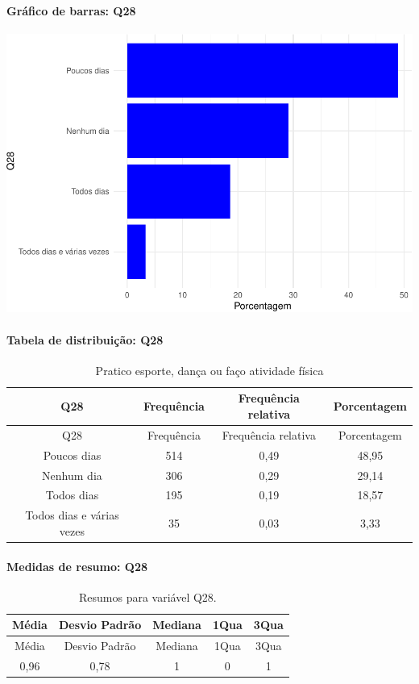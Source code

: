 \documentclass[]{article}
\let\oldparagraph\paragraph
\renewcommand{\paragraph}[1]{\oldparagraph{#1}\mbox{}}
\begin{document}
\hypertarget{gruxe1fico-de-barras-q28}{%
\paragraph{Gráfico de barras: Q28}\label{gruxe1fico-de-barras-q28}}

\begin{center}\includegraphics[width=0.75\linewidth]{relatorio_covid19_files/figure-latex/unnamed-chunk-835-1} \end{center}

\hypertarget{tabela-de-distribuiuxe7uxe3o-q28}{%
\paragraph{Tabela de distribuição: Q28}\label{tabela-de-distribuiuxe7uxe3o-q28}}

\begin{longtable}[]{@{}cccc@{}}
\caption{\label{tab:unnamed-chunk-836}Pratico esporte, dança ou faço atividade física}\tabularnewline
\toprule
Q28 & Frequência & Frequência relativa & Porcentagem\tabularnewline
\midrule
\endfirsthead
\toprule
Q28 & Frequência & Frequência relativa & Porcentagem\tabularnewline
\midrule
\endhead
Poucos dias & 514 & 0,49 & 48,95\tabularnewline
Nenhum dia & 306 & 0,29 & 29,14\tabularnewline
Todos dias & 195 & 0,19 & 18,57\tabularnewline
Todos dias e várias vezes & 35 & 0,03 & 3,33\tabularnewline
\bottomrule
\end{longtable}

\hypertarget{medidas-de-resumo-q28}{%
\paragraph{Medidas de resumo: Q28}\label{medidas-de-resumo-q28}}

\begin{longtable}[]{@{}ccccc@{}}
\caption{\label{tab:unnamed-chunk-837}Resumos para variável Q28.}\tabularnewline
\toprule
Média & Desvio Padrão & Mediana & 1Qua & 3Qua\tabularnewline
\midrule
\endfirsthead
\toprule
Média & Desvio Padrão & Mediana & 1Qua & 3Qua\tabularnewline
\midrule
\endhead
0,96 & 0,78 & 1 & 0 & 1\tabularnewline
\bottomrule
\end{longtable}
\end{document}
